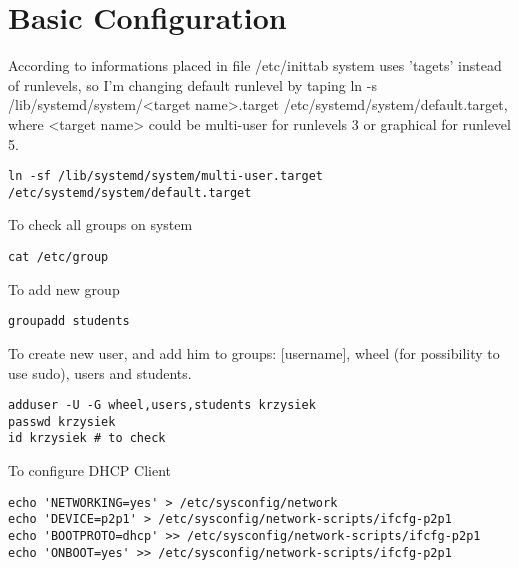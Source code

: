\documentclass[a4paper,12pt]{article}
\begin{document}
    \section{Basic Configuration}
    

    According to informations placed in file /etc/inittab system uses 'tagets' instead of runlevels, so I'm changing default runlevel by taping ln -s /lib/systemd/system/<target name>.target 
/etc/systemd/system/default.target, where <target name> could be multi-user for runlevels 3 or graphical for runlevel 5. 

    \begin{lstlisting}[frame=single]
ln -sf /lib/systemd/system/multi-user.target /etc/systemd/system/default.target
    \end{lstlisting}
    To check all groups on system
    \begin{lstlisting}[frame=single]
cat /etc/group
    \end{lstlisting}
    To add new group 
    \begin{lstlisting}[frame=single]
groupadd students
    \end{lstlisting}
    To create new user, and add him to groups: [username], wheel (for possibility to use sudo), users and students. 
    \begin{lstlisting}[frame=single]
adduser -U -G wheel,users,students krzysiek
passwd krzysiek
id krzysiek # to check
    \end{lstlisting}
    To configure  DHCP Client
    \begin{lstlisting}[frame=single]
echo 'NETWORKING=yes' > /etc/sysconfig/network 
echo 'DEVICE=p2p1' > /etc/sysconfig/network-scripts/ifcfg-p2p1 
echo 'BOOTPROTO=dhcp' >> /etc/sysconfig/network-scripts/ifcfg-p2p1 
echo 'ONBOOT=yes' >> /etc/sysconfig/network-scripts/ifcfg-p2p1 
    \end{lstlisting}
\end{document}
